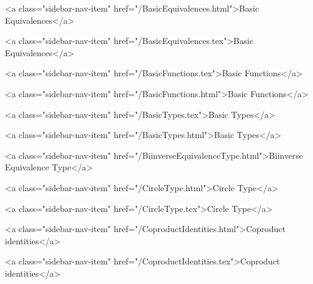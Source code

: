       
    
      
        
          <a class="sidebar-nav-item" href="/BasicEquivalences.html">Basic Equivalences</a>
        
      
    
      
        
          <a class="sidebar-nav-item" href="/BasicEquivalences.tex">Basic Equivalences</a>
        
      
    
      
        
          <a class="sidebar-nav-item" href="/BasicFunctions.tex">Basic Functions</a>
        
      
    
      
        
          <a class="sidebar-nav-item" href="/BasicFunctions.html">Basic Functions</a>
        
      
    
      
        
          <a class="sidebar-nav-item" href="/BasicTypes.tex">Basic Types</a>
        
      
    
      
        
          <a class="sidebar-nav-item" href="/BasicTypes.html">Basic Types</a>
        
      
    
      
        
          <a class="sidebar-nav-item" href="/BiinverseEquivalenceType.html">Biinverse Equivalence Type</a>
        
      
    
      
        
          <a class="sidebar-nav-item" href="/CircleType.html">Circle Type</a>
        
      
    
      
        
          <a class="sidebar-nav-item" href="/CircleType.tex">Circle Type</a>
        
      
    
      
        
          <a class="sidebar-nav-item" href="/CoproductIdentities.html">Coproduct identities</a>
        
      
    
      
        
          <a class="sidebar-nav-item" href="/CoproductIdentities.tex">Coproduct identities</a>
        

